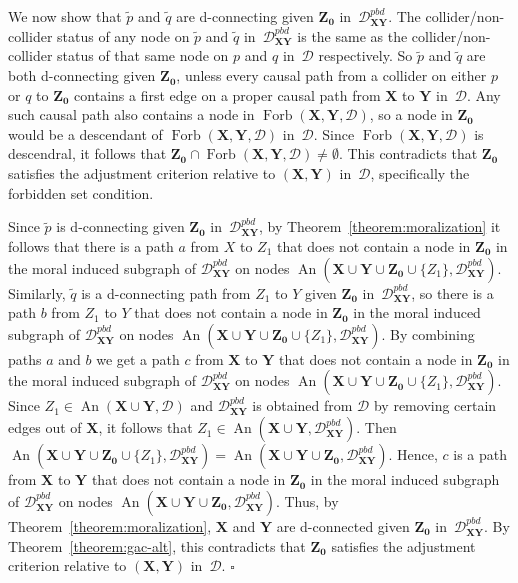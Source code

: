 \documentclass[11pt,a4paper]{article}
\newcommand{\bX}{\mathbf{X}}
\newcommand{\bY}{\mathbf{Y}}
\newenvironment{proofof}[1][]{\begin{trivlist}
   \item[\hskip \labelsep {\bfseries Proof of #1.}]}{\hfill{}$\square$\end{trivlist}}
\DeclareMathOperator{\An}{An}
\DeclareMathOperator{\Forbi}{Forb}
\newcommand{\forb}{the forbidden set condition\xspace}
\newcommand{\g}[1][G]{\mathcal{#1}}
\newcommand{\gpbd}[2][G]{\mathcal{#1}_{\mathbf{#2}}^{pbd}}
\newcommand{\fb}[2][X,Y]{\Forbi(\mathbf{#1},#2)}%
\begin{document}
\begin{proofof}[Lemma~\ref{lemma:zprime satisfies ac}]
We now show that $\tilde{p}$ and $\tilde{q}$ are d-connecting given $\mathbf{Z_0}$ in~$\gpbd[D]{XY}$. The collider/non-collider status of any node on $\tilde{p}$ and $\tilde{q}$ in~$\gpbd[D]{XY}$ is the same as the collider/non-collider status of that same node on $p$ and $q$ in~$\g[D]$ respectively. So $\tilde{p}$ and $\tilde{q}$ are both d-connecting given $\mathbf{Z_0}$, unless every causal path from a collider on either $p$ or $q$ to $\mathbf{Z_0}$ contains a first edge on a proper causal path from $\mathbf{X}$ to $\mathbf{Y}$ in~$\g[D]$. Any such causal path also contains a node in $\fb{\g[D]}$, so a node in $\mathbf{Z_0}$ would be a descendant of $\fb{\g[D]}$ in~$\g[D]$. Since $\fb{\g[D]}$ is descendral, it follows that $\mathbf{Z_0} \cap \fb{\g[D]} \neq \emptyset$. This contradicts that $\mathbf{Z_0}$ satisfies the adjustment criterion relative to $(\mathbf{X,Y})$ in~$\g[D]$, 
specifically \forb{}.

Since $\tilde{p}$ is d-connecting given $\mathbf{Z_0}$ in~$\gpbd[D]{XY}$, by Theorem~\ref{theorem:moralization} it follows that
there is a path $a$ from $X$ to $Z_1$ that does not contain a node in $\mathbf{Z_0}$ in the moral induced subgraph of $\gpbd[D]{XY}$ on nodes $\An( \bX  \cup \mathbf{Y} \cup \mathbf{Z_0} \cup \{Z_1\},\gpbd[D]{XY})$.
 Similarly, $\tilde{q}$ is a d-connecting path from $Z_1$ to $Y$ given $\mathbf{Z_0}$ in~$\gpbd[D]{XY}$, so there is a path $b$ from $Z_1$ to $Y$ that does not contain a node in $\mathbf{Z_0}$ in the moral induced subgraph of $\gpbd[D]{XY}$ on nodes $\An( \bX  \cup \mathbf{Y} \cup \mathbf{Z_0} \cup \{Z_1\},\gpbd[D]{XY})$.
By combining paths $a$ and $b$ we get a path $c$ from $\bX$ to $\bY$ that does not contain a node in $\mathbf{Z_0}$ in the moral induced subgraph of $\gpbd[D]{XY}$ on nodes $\An( \bX  \cup \mathbf{Y} \cup \mathbf{Z_0} \cup \{Z_1\},\gpbd[D]{XY})$.
Since $Z_1 \in \An(\mathbf{X} \cup \mathbf{Y},\g[D])$ and $\gpbd[D]{XY}$ is obtained from $\g[D]$ by removing certain edges out of $\mathbf{X}$, it follows that $Z_1 \in \An(\mathbf{X} \cup \mathbf{Y},\gpbd[D]{XY})$. Then $\An(\mathbf{X} \cup \bY \cup \mathbf{Z_0} \cup \{Z_1\},\gpbd[D]{XY}) = \An(\mathbf{X} \cup \bY \cup \mathbf{Z_0},\gpbd[D]{XY})$. Hence, $c$ is a path from $\mathbf{X}$ to $\mathbf{Y}$ that does not contain a node in $\mathbf{Z_0}$ in the moral induced subgraph of $\gpbd[D]{XY}$ on nodes $\An( \bX  \cup \mathbf{Y} \cup \mathbf{Z_0},\gpbd[D]{XY})$. 
Thus, by Theorem~\ref{theorem:moralization}, $\mathbf{X}$ and $\mathbf{Y}$ are d-connected given $\mathbf{Z_0}$ in~$\gpbd[D]{XY}$.
 By Theorem~\ref{theorem:gac-alt}, this contradicts that $\mathbf{Z_0}$ satisfies the adjustment criterion relative to $(\mathbf{X,Y})$ in~$\g[D]$.
\end{proofof}
\end{document}
